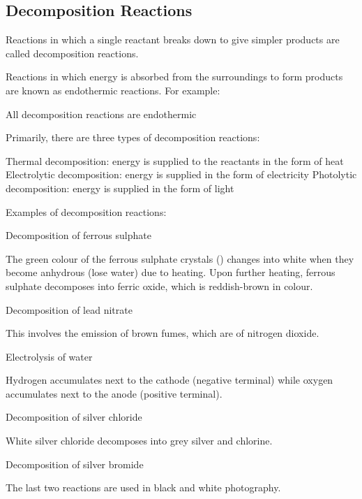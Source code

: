 \subsection{Decomposition Reactions}

\begin{outline}
    \1 Reactions in which a single reactant breaks down to give simpler products are called decomposition reactions.
    
    \1 Reactions in which energy is absorbed from the surroundings to form products are known as endothermic reactions. For example:


    \1 All decomposition reactions are endothermic

    \1 Primarily, there are three types of decomposition reactions:
    
    \2 Thermal decomposition: energy is supplied to the reactants in the form of heat
    \2 Electrolytic decomposition: energy is supplied in the form of electricity
    \2 Photolytic decomposition: energy is supplied in the form of light

    \1 Examples of decomposition reactions:

    \2 Decomposition of ferrous sulphate \\

    The green colour of the ferrous sulphate crystals () changes into white when they become anhydrous (lose water) due to heating. Upon further heating, ferrous sulphate decomposes into ferric oxide, which is reddish-brown in colour.

    \2 Decomposition of lead nitrate \\
    
    This involves the emission of brown fumes, which are of nitrogen dioxide.

    \2 Electrolysis of water \\

    Hydrogen accumulates next to the cathode (negative terminal) while oxygen accumulates next to the anode (positive terminal).

    \2 Decomposition of silver chloride \\

    White silver chloride decomposes into grey silver and chlorine.

    \2 Decomposition of silver bromide \\

    The last two reactions are used in black and white photography.
\end{outline}

